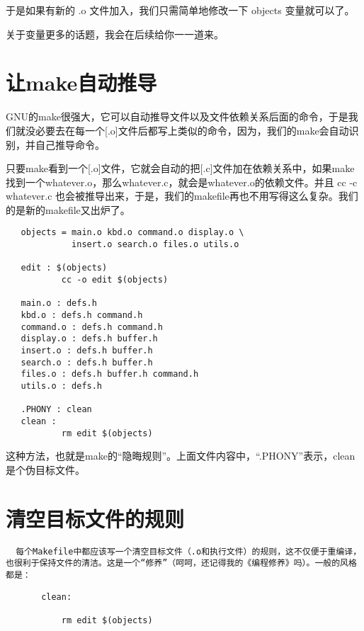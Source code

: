 \documentclass[]{book}
\begin{document}
于是如果有新的 .o 文件加入，我们只需简单地修改一下 objects 变量就可以了。

关于变量更多的话题，我会在后续给你一一道来。

\hypertarget{ux8ba9makeux81eaux52a8ux63a8ux5bfc}{%
\section{让make自动推导}\label{ux8ba9makeux81eaux52a8ux63a8ux5bfc}}

GNU的make很强大，它可以自动推导文件以及文件依赖关系后面的命令，于是我们就没必要去在每一个{[}.o{]}文件后都写上类似的命令，因为，我们的make会自动识别，并自己推导命令。

只要make看到一个{[}.o{]}文件，它就会自动的把{[}.c{]}文件加在依赖关系中，如果make找到一个whatever.o，那么whatever.c，就会是whatever.o的依赖文件。并且 cc -c whatever.c 也会被推导出来，于是，我们的makefile再也不用写得这么复杂。我们的是新的makefile又出炉了。

\begin{verbatim}
   objects = main.o kbd.o command.o display.o \
             insert.o search.o files.o utils.o
 
   edit : $(objects)
           cc -o edit $(objects)
 
   main.o : defs.h
   kbd.o : defs.h command.h
   command.o : defs.h command.h
   display.o : defs.h buffer.h
   insert.o : defs.h buffer.h
   search.o : defs.h buffer.h
   files.o : defs.h buffer.h command.h
   utils.o : defs.h
 
   .PHONY : clean
   clean :
           rm edit $(objects)
\end{verbatim}

这种方法，也就是make的``隐晦规则''。上面文件内容中，``.PHONY''表示，clean是个伪目标文件。

\hypertarget{ux6e05ux7a7aux76eeux6807ux6587ux4ef6ux7684ux89c4ux5219}{%
\section{清空目标文件的规则}\label{ux6e05ux7a7aux76eeux6807ux6587ux4ef6ux7684ux89c4ux5219}}

\begin{verbatim}
  每个Makefile中都应该写一个清空目标文件（.o和执行文件）的规则，这不仅便于重编译，也很利于保持文件的清洁。这是一个“修养”（呵呵，还记得我的《编程修养》吗）。一般的风格都是：
\end{verbatim}

\begin{verbatim}
       clean:

           rm edit $(objects)
\end{verbatim}
\end{document}
